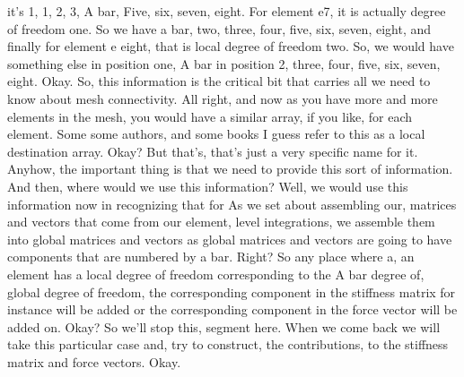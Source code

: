 \documentclass[10pt]{article}
\begin{document}
it's 1, 1, 2, 3, A bar, Five, six, seven, eight. For element e7, it is actually degree of freedom one. So we have a bar, two, three, four, five, six, seven, eight, and finally for element e eight, that is local degree of freedom two. So, we would have something else in position one, A bar in position 2, three, four, five, six, seven, eight. Okay. So, this information is the critical bit that carries all we need to know about mesh connectivity. All right, and now as you have more and more elements in the mesh, you would have a similar array, if you like, for each element. Some some authors, and some books I guess refer to this as a local destination array. Okay? But that's, that's just a very specific name for it. Anyhow, the important thing is that we need to provide this sort of information. And then, where would we use this information? Well, we would use this information now in recognizing that for As we set about assembling our, matrices and vectors that come from our element, level integrations, we assemble them into global matrices and vectors as global matrices and vectors are going to have components that are numbered by a bar. Right? So any place where a, an element has a local degree of freedom corresponding to the A bar degree of, global degree of freedom, the corresponding component in the stiffness matrix for instance will be added or the corresponding component in the force vector will be added on. Okay? So we'll stop this, segment here. When we come back we will take this particular case and, try to construct, the contributions, to the stiffness matrix and force vectors. Okay.
\end{document}
